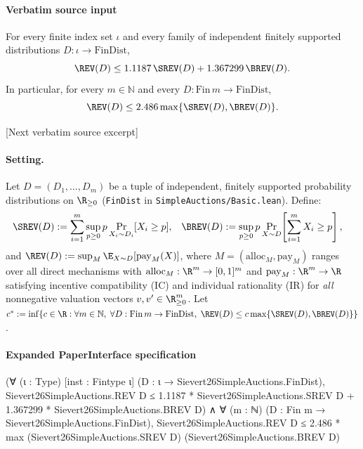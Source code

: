 \documentclass[10pt]{article}
\begin{document}
\paragraph{Verbatim source input}
\begin{ReviewVerbatim}
\begin{theorem}\label{thm:ub}
For every finite index set $\iota$ and every family of independent finitely supported distributions $D : \iota \to \mathrm{FinDist}$,
\[
  \REV(D) \le 1.1187\,\SREV(D) + 1.367299\,\BREV(D).
\]
In particular, for every $m \in \mathbb{N}$ and every $D : \mathrm{Fin}\,m \to \mathrm{FinDist}$,
\[
  \REV(D) \le 2.486 \max\{\SREV(D), \BREV(D)\}.
\]
\end{theorem}

[Next verbatim source excerpt]

\paragraph{Setting.}
Let $D = (D_1, \dots, D_m)$ be a tuple of independent, finitely supported probability distributions on $\R_{\ge 0}$ (\texttt{FinDist} in \texttt{SimpleAuctions/Basic.lean}). Define:
\begin{align*}
  \SREV(D) &:= \sum_{i=1}^m \sup_{p \ge 0} p \Pr_{X_i \sim D_i}[X_i \ge p], &
  \BREV(D) &:= \sup_{p \ge 0} p \Pr_{X \sim D}\!\left[\sum_{i=1}^m X_i \ge p\right],
\end{align*}
and $\REV(D) := \sup_{M} \E_{X \sim D}[\mathrm{pay}_M(X)]$, where $M = (\mathrm{alloc}_M, \mathrm{pay}_M)$ ranges over all direct mechanisms with $\mathrm{alloc}_M : \R^m \to [0,1]^m$ and $\mathrm{pay}_M : \R^m \to \R$ satisfying incentive compatibility (IC) and individual rationality (IR) for \emph{all} nonnegative valuation vectors $v, v' \in \R_{\ge 0}^m$. Let $c^* := \inf\{c \in \R : \forall m \in \mathbb{N},\; \forall D : \mathrm{Fin}\,m \to \mathrm{FinDist},\; \REV(D) \le c \max\{\SREV(D),\BREV(D)\}\}$.
\end{ReviewVerbatim}



\paragraph{Expanded PaperInterface specification}
\begin{ReviewVerbatim}
(∀ (ι : Type) [inst : Fintype ι] (D : ι → Sievert26SimpleAuctions.FinDist),
    Sievert26SimpleAuctions.REV D ≤
      1.1187 * Sievert26SimpleAuctions.SREV D + 1.367299 * Sievert26SimpleAuctions.BREV D) ∧
  ∀ (m : ℕ) (D : Fin m → Sievert26SimpleAuctions.FinDist),
    Sievert26SimpleAuctions.REV D ≤ 2.486 * max (Sievert26SimpleAuctions.SREV D) (Sievert26SimpleAuctions.BREV D)
\end{ReviewVerbatim}
\end{document}
